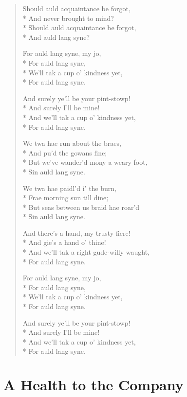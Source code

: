 \documentclass[9pt,twoside]{extarticle}
\newenvironment{xverse}{
	\begin{verse}
	\fontsize{8.5}{10.5}\selectfont
	}
	{
	\end{verse}
	\penalty 0
}
\begin{document}
\begin{xverse}
Should auld acquaintance be forgot, \\*
And never brought to mind? \\*
Should auld acquaintance be forgot, \\*
And auld lang syne?

For auld lang syne, my jo, \\*
For auld lang syne, \\*
We’ll tak a cup o’ kindness yet, \\*
For auld lang syne.

And surely ye’ll be your pint-stowp! \\*
And surely I’ll be mine! \\*
And we’ll tak a cup o’ kindness yet, \\*
For auld lang syne.

We twa hae run about the braes, \\*
And pu’d the gowans fine; \\*
But we’ve wander’d mony a weary foot, \\*
Sin auld lang syne.

We twa hae paidl’d i’ the burn, \\*
Frae morning sun till dine; \\*
But seas between us braid hae roar’d \\*
Sin auld lang syne.

And there’s a hand, my trusty fiere! \\*
And gie’s a hand o’ thine! \\*
And we’ll tak a right gude-willy waught, \\*
For auld lang syne.

For auld lang syne, my jo, \\*
For auld lang syne, \\*
We’ll tak a cup o’ kindness yet, \\*
For auld lang syne.

And surely ye’ll be your pint-stowp! \\*
And surely I’ll be mine! \\*
And we’ll tak a cup o’ kindness yet, \\*
For auld lang syne.
\end{xverse}


\section{A Health to the Company}
\end{document}
